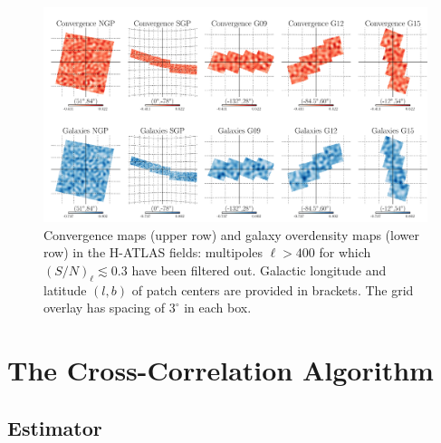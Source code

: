 \begin{figure}[t] %
\centering %
\includegraphics[width=\textwidth]{Chapter3/Images/f5}
\caption{Convergence maps (upper row) and galaxy overdensity maps (lower row) in the H-ATLAS fields: multipoles $\ell > 400$ for which $(S/N)_{\ell} \lesssim 0.3$ have been filtered out. Galactic longitude and latitude $(l,b)$ of patch centers are provided in brackets. The grid overlay has spacing of $3^\circ$ in each box. \label{fig:patches}}
\end{figure}


\section{The Cross-Correlation Algorithm}
\label{sec:estimatorxc1}

\subsection{Estimator}

